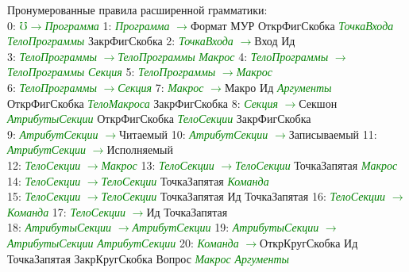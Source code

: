 \documentclass[a0]{a0poster}
\begin{document}
Пронумерованные правила расширенной грамматики:\\
0: \textcolor{Green}{$\mho$}\textcolor{Green}{$\to$}\textcolor{Green}{\textit{Программа}} 1: \textcolor{Green}{\textit{Программа}} \textcolor{Green}{$\to$}Формат МУР ОткрФигСкобка \textcolor{Green}{\textit{ТочкаВхода}} \textcolor{Green}{\textit{ТелоПрограммы}} ЗакрФигСкобка 2: \textcolor{Green}{\textit{ТочкаВхода}} \textcolor{Green}{$\to$}Вход Ид \\
3: \textcolor{Green}{\textit{ТелоПрограммы}} \textcolor{Green}{$\to$}\textcolor{Green}{\textit{ТелоПрограммы}} \textcolor{Green}{\textit{Макрос}} 4: \textcolor{Green}{\textit{ТелоПрограммы}} \textcolor{Green}{$\to$}\textcolor{Green}{\textit{ТелоПрограммы}} \textcolor{Green}{\textit{Секция}} 5: \textcolor{Green}{\textit{ТелоПрограммы}} \textcolor{Green}{$\to$}\textcolor{Green}{\textit{Макрос}} \\
6: \textcolor{Green}{\textit{ТелоПрограммы}} \textcolor{Green}{$\to$}\textcolor{Green}{\textit{Секция}} 7: \textcolor{Green}{\textit{Макрос}} \textcolor{Green}{$\to$}Макро Ид \textcolor{Green}{\textit{Аргументы}} ОткрФигСкобка \textcolor{Green}{\textit{ТелоМакроса}} ЗакрФигСкобка 8: \textcolor{Green}{\textit{Секция}} \textcolor{Green}{$\to$}Секшон \textcolor{Green}{\textit{АтрибутыСекции}} ОткрФигСкобка \textcolor{Green}{\textit{ТелоСекции}} ЗакрФигСкобка \\
9: \textcolor{Green}{\textit{АтрибутСекции}} \textcolor{Green}{$\to$}Читаемый 10: \textcolor{Green}{\textit{АтрибутСекции}} \textcolor{Green}{$\to$}Записываемый 11: \textcolor{Green}{\textit{АтрибутСекции}} \textcolor{Green}{$\to$}Исполняемый \\
12: \textcolor{Green}{\textit{ТелоСекции}} \textcolor{Green}{$\to$}\textcolor{Green}{\textit{Макрос}} 13: \textcolor{Green}{\textit{ТелоСекции}} \textcolor{Green}{$\to$}\textcolor{Green}{\textit{ТелоСекции}} ТочкаЗапятая \textcolor{Green}{\textit{Макрос}} 14: \textcolor{Green}{\textit{ТелоСекции}} \textcolor{Green}{$\to$}\textcolor{Green}{\textit{ТелоСекции}} ТочкаЗапятая \textcolor{Green}{\textit{Команда}} \\
15: \textcolor{Green}{\textit{ТелоСекции}} \textcolor{Green}{$\to$}\textcolor{Green}{\textit{ТелоСекции}} ТочкаЗапятая Ид ТочкаЗапятая 16: \textcolor{Green}{\textit{ТелоСекции}} \textcolor{Green}{$\to$}\textcolor{Green}{\textit{Команда}} 17: \textcolor{Green}{\textit{ТелоСекции}} \textcolor{Green}{$\to$}Ид ТочкаЗапятая \\
18: \textcolor{Green}{\textit{АтрибутыСекции}} \textcolor{Green}{$\to$}\textcolor{Green}{\textit{АтрибутСекции}} 19: \textcolor{Green}{\textit{АтрибутыСекции}} \textcolor{Green}{$\to$}\textcolor{Green}{\textit{АтрибутыСекции}} \textcolor{Green}{\textit{АтрибутСекции}} 20: \textcolor{Green}{\textit{Команда}} \textcolor{Green}{$\to$}ОткрКругСкобка Ид ТочкаЗапятая ЗакрКругСкобка Вопрос \textcolor{Green}{\textit{Макрос}} \textcolor{Green}{\textit{Аргументы}} \\
\end{document}
